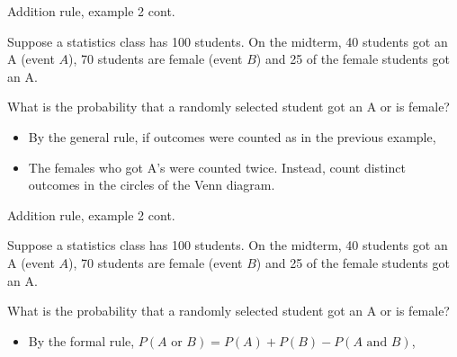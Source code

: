 \documentclass[xcolor=table, aspectratio=169, bigger, handout]{beamer}
\begin{document}
\begin{frame}{Addition rule, example 2 cont.}
\begin{block}{}
Suppose a statistics class has 100 students. On the midterm, 40 students got an A (event $A$),  70 students are female (event $B$) and 25 of the female students got an A.
\end{block}
\begin{exampleblock}{}
What is the probability that a randomly selected student got an A or is female?
\begin{itemize}
\pause
\item By the general rule, if outcomes were counted as in the previous example,\\
\smallskip{}

\pause
\item The females who got A's were counted twice. Instead, count distinct outcomes in the circles of the Venn diagram.\\
\smallskip{}

\end{itemize}
\end{exampleblock}

\end{frame}

\begin{frame}{Addition rule, example 2 cont.}
\begin{block}{}
Suppose a statistics class has 100 students. On the midterm, 40 students got an A (event $A$),  70 students are female (event $B$) and 25 of the female students got an A.
\end{block}

\begin{exampleblock}{}
What is the probability that a randomly selected student got an A or is female?
\begin{itemize}
\pause
\item By the formal rule, $P(A \text{ or } B) = P(A) + P(B) - P(A \text{ and } B)$,\\
\smallskip{}
\smallskip{}
\end{itemize}
\end{exampleblock}
\end{frame}
\end{document}
